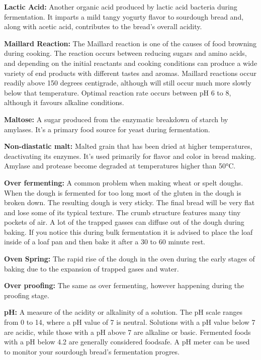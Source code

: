 \textbf{Lactic Acid:} Another organic acid produced by lactic acid bacteria during
fermentation. It imparts a mild tangy yogurty flavor to sourdough bread and, along
with acetic acid, contributes to the bread's overall acidity.

\textbf{Maillard Reaction:} The Maillard reaction is one of the causes of food browning
during cooking. The reaction occurs between reducing sugars and amino acids, and
depending on the initial reactants and cooking conditions can produce a wide variety
of end products with different tastes and aromas. Maillard reactions occur readily
above 150 degrees centigrade, although will still occur much more slowly below that
temperature. Optimal reaction rate occurs between pH 6 to 8, although it favours
alkaline conditions.

\textbf{Maltose:} A sugar produced from the enzymatic breakdown of starch by amylases.
It's a primary food source for yeast during fermentation.

\textbf{Non-diastatic malt:} Malted grain that has been dried at higher temperatures,
deactivating its enzymes. It's used primarily for flavor and color in bread making.
Amylase and protease become degraded at temperatures higher than 50°C.

\textbf{Over fermenting:} A common problem when making wheat or spelt doughs. When the
dough is fermented for too long most of the gluten in the dough is broken down. The
resulting dough is very sticky. The final bread will be very flat and lose some of its
typical texture. The crumb structure features many tiny pockets of air. A lot of the
trapped gasses can diffuse out of the dough during baking. If you notice this during
bulk fermentation it is advised to place the loaf inside of a loaf pan and then bake
it after a 30 to 60 minute rest.

\textbf{Oven Spring:} The rapid rise of the dough in the oven during the early stages
of baking due to the expansion of trapped gases and water.

\textbf{Over proofing:} The same as over fermenting, however happening during the
proofing stage.

\textbf{pH:} A measure of the acidity or alkalinity of a solution. The pH scale
ranges from 0 to 14, where a pH value of 7 is neutral. Solutions with a pH value below
7 are acidic, while those with a pH above 7 are alkaline or basic. Fermented
foods with a pH below 4.2 are generally considered foodsafe. A pH meter can be
used to monitor your sourdough bread's fermentation progres.

